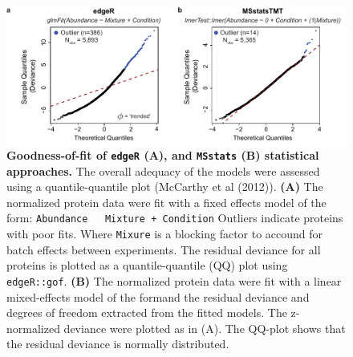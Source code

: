 \documentclass[12pt]{article}
\begin{document}
\begin{figure}[!h]
		\includegraphics{fig_01}
		\caption{\textbf{Goodness-of-fit of \texttt{edgeR} (A), and 
		\texttt{MSstats} (B) statistical approaches.} The overall
		adequacy of the models were assessed using a quantile-quantile
		plot (McCarthy et al (2012)). \textbf{(A)} The normalized
		protein data were fit with a fixed effects model of the form: 
		\texttt{Abundance ~ Mixture + Condition}
		Outliers indicate proteins with poor fits.
		Where \texttt{Mixure} 
		is a blocking factor to accound for batch effects between
		experiments. The residual deviance for all proteins is plotted as
		a  quantile-quantile (QQ) plot using \texttt{edgeR::gof}.
		\textbf{(B)}
		The normalized protein data were fit with a linear mixed-effects 
		model of the formand the residual deviance and degrees of 
		freedom extracted from the fitted models. The z-normalized
		deviance were plotted as in (A). The QQ-plot shows that the
		residual deviance is normally distributed.}
\end{figure}
\end{document}
